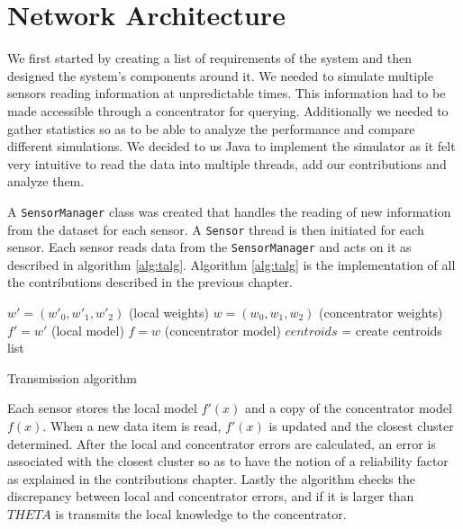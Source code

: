 \documentclass{mproj}
\begin{document}
\section{Network Architecture}
We first started by creating a list of requirements of the system and then designed the system's components around it. We needed to simulate multiple sensors reading information at unpredictable times. This information had to be made accessible through a concentrator for querying. Additionally we needed to gather statistics so as to be able to analyze the performance and compare different simulations. We decided to us Java to implement the simulator as it felt very intuitive to read the data into multiple threads, add our contributions and analyze them.

A \texttt{SensorManager} class was created that handles the reading of new information from the dataset for each sensor. A \texttt{Sensor} thread is then initiated for each sensor. Each sensor reads data from the \texttt{SensorManager} and acts on it as described in algorithm \ref{alg:talg}. Algorithm \ref{alg:talg} is the implementation of all the contributions described in the previous chapter. 

\begin{algorithm}[H]
$w'=(w'_0,w'_1,w'_2)$ (local weights)\;
$w=(w_0,w_1,w_2)$ (concentrator weights)\;
$f' = w'$ (local model)\;
$f = w$ (concentrator model)\;
$centroids$ = create centroids list\;
 \caption{Transmission algorithm}
 \label{alg:talg}
\end{algorithm}

Each sensor stores the local model $f'(x)$ and a copy of the concentrator model $f(x)$. When a new data item is read, $f'(x)$ is updated and the closest cluster determined. After the local and concentrator errors are calculated, an error is associated with the closest cluster so as to have the notion of a reliability factor as explained in the contributions chapter. Lastly the algorithm checks the discrepancy between local and concentrator errors, and if it is larger than $THETA$ is transmits the local knowledge to the concentrator.
\end{document}
